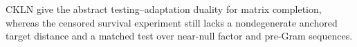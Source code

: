CKLN give the abstract testing--adaptation duality for matrix completion, whereas the censored survival experiment still lacks a nondegenerate anchored target distance and a matched test over near-null factor and pre-Gram sequences.